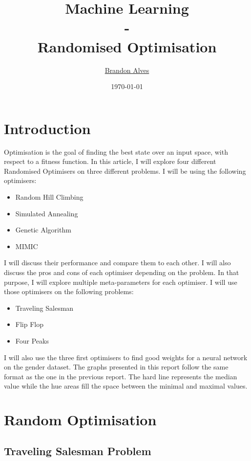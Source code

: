 \documentclass[twocolumn, 10pt]{article}
\title{
	Machine Learning
	\\-\\
	Randomised Optimisation
}
\author{
	\href{mailto:brandon.alves@gatech.edu}{Brandon Alves}
}
\date{\today}
\begin{document}
	\maketitle
	\thispagestyle{empty}
	\tableofcontents
	\listoffigures
	\section{Introduction}
		Optimisation is the goal of finding the best state over an input space, with respect to a fitness function. In this article, I will explore four different Randomised Optimisers on three different problems. I will be using the following optimisers:
		\begin{itemize}
			\item Random Hill Climbing
			\item Simulated Annealing
			\item Genetic Algorithm
			\item MIMIC
		\end{itemize}
		I will discuss their performance and compare them to each other. I will also discuss the pros and cons of each optimiser depending on the problem. In that purpose, I will explore multiple meta-parameters for each optimiser. I will use those optimisers on the following problems:
		\begin{itemize}
			\item Traveling Salesman
			\item Flip Flop
			\item Four Peaks
		\end{itemize}
		I will also use the three first optimisers to find good weights for a neural network on the gender dataset. The graphs presented in this report follow the same format as the one in the previous report. The hard line represents the median value while the hue areas fill the space between the minimal and maximal values.
	\section{Random Optimisation}
		\subsection{Traveling Salesman Problem}
\end{document}
